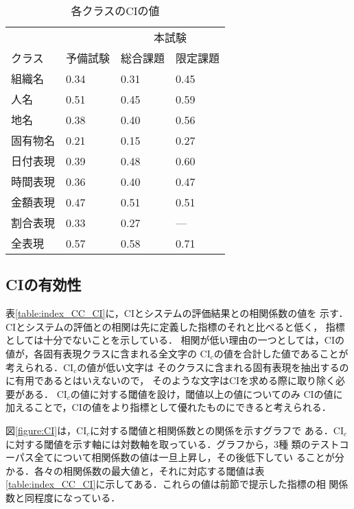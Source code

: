 \begin{table}[tb]\small
\caption{\label{table:CI}各クラスのCIの値}
\begin{center}
\begin{tabular}{|l||l|l|l|} \hline
         &          & \multicolumn{2}{|c|}{本試験}\\ \cline{3-4}
クラス   & 予備試験 & 総合課題 & 限定課題 \\ \hline \hline
組織名   &     0.34 &     0.31 &     0.45 \\ \hline
人名     &     0.51 &     0.45 &     0.59 \\ \hline
地名     &     0.38 &     0.40 &     0.56 \\ \hline
固有物名 &     0.21 &     0.15 &     0.27 \\ \hline
日付表現 &     0.39 &     0.48 &     0.60 \\ \hline
時間表現 &     0.36 &     0.40 &     0.47 \\ \hline
金額表現 &     0.47 &     0.51 &     0.51 \\ \hline
割合表現 &     0.33 &     0.27 &     ---  \\ \hline \hline
全表現   &     0.57 &     0.58 &     0.71 \\ \hline
\end{tabular}
\end{center}
\end{table}

\subsection{CIの有効性}

表\ref{table:index_CC_CI}に，CIとシステムの評価結果との相関係数の値を
示す．CIとシステムの評価との相関は先に定義した指標のそれと比べると低く，
指標としては十分でないことを示している．
相関が低い理由の一つとしては，CIの値が，各固有表現クラスに含まれる全文字の
CI$_c$の値を合計した値であることが考えられる．CI$_c$の値が低い文字は
そのクラスに含まれる固有表現を抽出するのに有用であるとはいえないので，
そのような文字はCIを求める際に取り除く必要がある．
CI$_c$の値に対する閾値を設け，閾値以上の値についてのみ
CIの値に加えることで，CIの値をより指標として優れたものにできると考えられる．

図\ref{figure:CI}は，CI$_c$に対する閾値と相関係数との関係を示すグラフで
ある．CI$_c$に対する閾値を示す軸には対数軸を取っている．グラフから，3種
類のテストコーパス全てについて相関係数の値は一旦上昇し，その後低下してい
ることが分かる．各々の相関係数の最大値と，それに対応する閾値は表
\ref{table:index_CC_CI}に示してある．これらの値は前節で提示した指標の相
関係数と同程度になっている．

